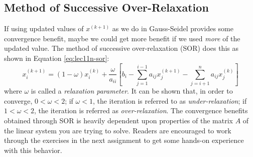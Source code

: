 \subsection{Method of Successive Over-Relaxation}
If using updated values of $x^{(k+1)}$ as we do in Gauss-Seidel provides some convergence benefit, maybe we could get more benefit if we used \emph{more} of the updated value.  The method of successive over-relaxation (SOR) does this as shown in Equation \ref{eq:lec11n-sor}:
\begin{equation}
x_{i}^{(k+1)} = (1-\omega) x_{i}^{(k)} + \frac{\omega}{a_{ii}}\left[b_{i} - \sum\limits_{j=1}^{i-1}a_{ij}x_{j}^{(k+1)} - \sum\limits_{j=i+1}^{n}a_{ij}x_j^{(k)} \right]
\label{eq:lec11n-sor}
\end{equation}
where $\omega$ is called a \emph{relaxation parameter}.  It can be shown that, in order to converge, $0 < \omega < 2$; if $\omega<1$, the iteration is referred to as \emph{under-relaxation}; if $1 < \omega < 2$, the iteration is referred as \emph{over-relaxation}.  The convergence benefits obtained through SOR is heavily dependent upon properties of the matrix $A$ of the linear system you are trying to solve.  Readers are encouraged to work through the exercises in the next assignment to get some hands-on experience with this behavior.  
